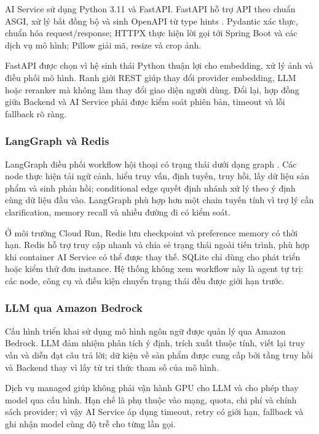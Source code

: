 AI Service sử dụng Python 3.11 và FastAPI. FastAPI hỗ trợ API theo chuẩn ASGI, xử lý bất đồng bộ và sinh OpenAPI từ type hints \parencite{fastapidocs2024}. Pydantic xác thực, chuẩn hóa request/response; HTTPX thực hiện lời gọi tới Spring Boot và các dịch vụ mô hình; Pillow giải mã, resize và crop ảnh.

FastAPI được chọn vì hệ sinh thái Python thuận lợi cho embedding, xử lý ảnh và điều phối mô hình. Ranh giới REST giúp thay đổi provider embedding, LLM hoặc reranker mà không làm thay đổi giao diện người dùng. Đổi lại, hợp đồng giữa Backend và AI Service phải được kiểm soát phiên bản, timeout và lỗi fallback rõ ràng.

\subsubsection{LangGraph và Redis}

LangGraph điều phối workflow hội thoại có trạng thái dưới dạng graph \parencite{langgraph2024docs}. Các node thực hiện tải ngữ cảnh, hiểu truy vấn, định tuyến, truy hồi, lấy dữ liệu sản phẩm và sinh phản hồi; conditional edge quyết định nhánh xử lý theo ý định cùng dữ liệu đầu vào. LangGraph phù hợp hơn một chain tuyến tính vì trợ lý cần clarification, memory recall và nhiều đường đi có kiểm soát.

Ở môi trường Cloud Run, Redis lưu checkpoint và preference memory có thời hạn. Redis hỗ trợ truy cập nhanh và chia sẻ trạng thái ngoài tiến trình, phù hợp khi container AI Service có thể được thay thế. SQLite chỉ dùng cho phát triển hoặc kiểm thử đơn instance. Hệ thống không xem workflow này là agent tự trị: các node, công cụ và điều kiện chuyển trạng thái đều được giới hạn trước.

\subsubsection{LLM qua Amazon Bedrock}

Cấu hình triển khai sử dụng mô hình ngôn ngữ được quản lý qua Amazon Bedrock. LLM đảm nhiệm phân tích ý định, trích xuất thuộc tính, viết lại truy vấn và diễn đạt câu trả lời; dữ kiện về sản phẩm được cung cấp bởi tầng truy hồi và Backend thay vì lấy từ tri thức tham số của mô hình.

Dịch vụ managed giúp không phải vận hành GPU cho LLM và cho phép thay model qua cấu hình. Hạn chế là phụ thuộc vào mạng, quota, chi phí và chính sách provider; vì vậy AI Service áp dụng timeout, retry có giới hạn, fallback và ghi nhận model cùng độ trễ cho từng lần gọi.

